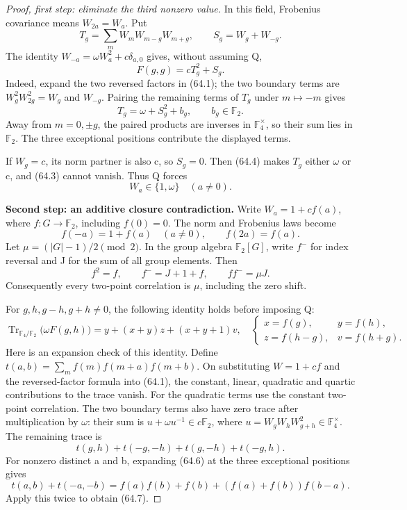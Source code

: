 \documentclass[11pt,reqno]{amsart}
\theoremstyle{plain}
\begin{document}
\begin{proof}[Proof, first step: eliminate the third nonzero value]
In this field,
Frobenius covariance means \(W_{2a}=W_a\). Put
\[
 T_g=\sum_m W_mW_{m-g}W_{m+g},\qquad S_g=W_g+W_{-g}.
\]
The identity
\(W_{-a}=\omega W_a^2+c\delta_{a,0}\) gives, without assuming Q,
\begin{equation*}
 F(g,g)=cT_g^2+S_g.
 \tag{64.3}
\end{equation*}
Indeed, expand the two reversed factors in (64.1); the two boundary
terms are \(W_g^2W_{2g}^2=W_g\) and \(W_{-g}\).
Pairing the remaining terms of \(T_g\) under \(m\mapsto-m\)
gives
\begin{equation*}
 T_g=\omega+S_g^2+b_g,\qquad b_g\in\mathbb F_2.
 \tag{64.4}
\end{equation*}
Away from \(m=0,\pm g\), the paired products are inverses in
\(\mathbb F_4^\times\), so their sum lies in \(\mathbb F_2\).
The three exceptional positions contribute the displayed terms.

If \(W_g=c\), its norm partner is also c, so \(S_g=0\).
Then (64.4) makes \(T_g\) either \(\omega\) or c, and (64.3)
cannot vanish. Thus Q forces
\begin{equation*}
 W_a\in\{1,\omega\}\quad(a\ne0).
 \tag{64.5}
\end{equation*}

\textbf{Second step: an additive closure contradiction.} Write
\(W_a=1+c f(a)\), where \(f:G\to\mathbb F_2\), including
\(f(0)=0\). The norm and Frobenius laws become
\begin{equation*}
 f(-a)=1+f(a)\quad(a\ne0),\qquad f(2a)=f(a).
 \tag{64.6}
\end{equation*}
Let \(\mu=(|G|-1)/2\pmod2\). In the group algebra
\(\mathbb F_2[G]\), write \(f^-\) for index reversal and J for
the sum of all group elements. Then
\[
 f^2=f,\qquad f^-=J+1+f,\qquad ff^-=\mu J.
\]
Consequently every two-point correlation is \(\mu\), including
the zero shift.

For \(g,h,g-h,g+h\ne0\), the following identity holds before
imposing Q:
\begin{equation*}
 \boxed{\displaystyle
 \operatorname{Tr}_{\mathbb F_4/\mathbb F_2}
       \bigl(\omega F(g,h)\bigr)
 =y+(x+y)z+(x+y+1)v,
 }
 \quad
 \begin{cases}
 x=f(g),&y=f(h),\\
 z=f(h-g),&v=f(h+g).
 \end{cases}
 \tag{64.7}
\end{equation*}
Here is an expansion check of this identity. Define
\(t(a,b)=\sum_m f(m)f(m+a)f(m+b)\). On substituting
\(W=1+cf\) and the reversed-factor formula into (64.1), the
constant, linear, quadratic and quartic contributions to the trace
vanish. For the quadratic terms use the constant two-point correlation.
The two boundary terms also have zero trace after multiplication by
\(\omega\): their sum is \(u+\omega u^{-1}\in c\mathbb F_2\),
where \(u=W_gW_hW_{g+h}^2\in\mathbb F_4^\times\).
The remaining trace is
\[
 t(g,h)+t(-g,-h)+t(g,-h)+t(-g,h).
\]
For nonzero distinct a and b, expanding (64.6) at the three
exceptional positions gives
\[
 t(a,b)+t(-a,-b)
 =f(a)f(b)+f(b)+(f(a)+f(b))f(b-a).
\]
Apply this twice to obtain (64.7).


\end{proof}
\end{document}

